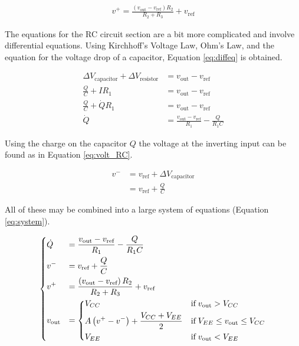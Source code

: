 \documentclass[12pt]{article}
\begin{document}
\begin{align} \label{eq:volt_divide}
v^+ = \frac{\left(v_\text{out} - v_\text{ref}\right)R_2}{R_2 + R_3} + v_\text{ref}
\end{align}

The equations for the RC circuit section are a bit more complicated and involve differential equations. Using Kirchhoff's Voltage Law, Ohm's Law, and the equation for the voltage drop of a capacitor, Equation \ref{eq:diffeq} is obtained.

\begin{align} \label{eq:diffeq}
\Delta V_\text{capacitor} + \Delta V_\text{resistor} &= v_\text{out} - v_\text{ref} \nonumber\\
\frac{Q}{C} + IR_1 &= v_\text{out} - v_\text{ref} \nonumber\\
\frac{Q}{C} + \dot{Q}R_1 &= v_\text{out} - v_\text{ref} \nonumber\\
\dot{Q} &= \frac{v_\text{out} - v_\text{ref}}{R_1} - \frac{Q}{R_1C}
\end{align}

\noindent
Using the charge on the capacitor $Q$ the voltage at the inverting input can be found as in Equation \ref{eq:volt_RC}.

\begin{align} \label{eq:volt_RC}
v^- &= v_\text{ref} + \Delta V_\text{capacitor} \nonumber\\
    &= v_\text{ref} + \frac{Q}{C}
\end{align}

\noindent
All of these may be combined into a large system of equations (Equation \ref{eq:system}).

\begin{spreadlines}{0.5ex}
\begin{equation} \label{eq:system}
\begin{dcases}
\dot{Q} &= \frac{v_\text{out} - v_\text{ref}}{R_1} - \frac{Q}{R_1C}\\
v^- &= v_\text{ref} + \frac{Q}{C}\\
v^+ &= \frac{\left(v_\text{out} - v_\text{ref}\right)R_2}{R_2 + R_3} + v_\text{ref}\\
v_\text{out} &=
    \begin{dcases}
    V_{CC} & \text{if}\; v_\text{out} > V_{CC}\\
    A\left(v^+ - v^-\right) + \frac{V_{CC} + V_{EE}}{2} & \text{if}\; V_{EE} \leq v_\text{out} \leq V_{CC} \\
    V_{EE} & \text{if}\; v_\text{out} < V_{EE}\\ 
    \end{dcases}
\end{dcases}
\end{equation}
\end{spreadlines}
\end{document}
